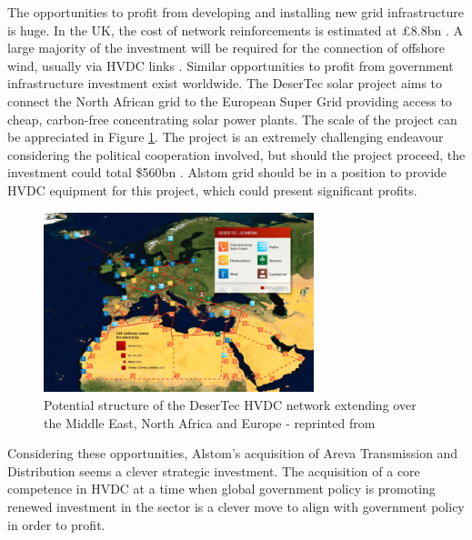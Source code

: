The opportunities to profit from developing and installing new grid infrastructure is huge.
In the UK, the cost of network reinforcements is estimated at \pounds8.8bn \cite{NetworkStrategyGroup}. 
A large majority of the investment will be required for the connection of offshore wind, usually via HVDC links \cite{NetworkStrategyGroup}.
Similar opportunities to profit from government infrastructure investment exist worldwide.
The DeserTec solar project aims to connect the North African grid to the European Super Grid providing access to cheap, carbon-free concentrating solar power plants. 
The scale of the project can be appreciated in Figure \ref{figure:Desertec}.
The project is an extremely challenging endeavour considering the political cooperation involved, but should the project proceed, the investment could total \$560bn \cite{DesertTec}.
Alstom grid should be in a position to provide HVDC equipment for this project, which could present significant profits.

\begin{figure}[!h]
\centering
\includegraphics[width = 0.7\textwidth]{Figures/Desertec.jpg}
\caption{Potential structure of the DeserTec HVDC network extending over the Middle East, North Africa and Europe - reprinted from \cite{DesertTec}}
\label{figure:Desertec}
\end{figure}

Considering these opportunities, Alstom's acquisition of Areva Transmission and Distribution seems a clever strategic investment.
The acquisition of a core competence in HVDC at a time when global government policy is promoting renewed investment in the sector is a clever move to align with government policy in order to profit.





